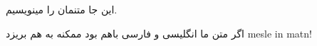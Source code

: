 \documentclass{article}
\begin{document}
	این جا متنمان را مینویسیم.

	اگر متن ما انگلیسی و فارسی باهم بود ممکنه به هم بریزد mesle in matn!
	
\end{document}

